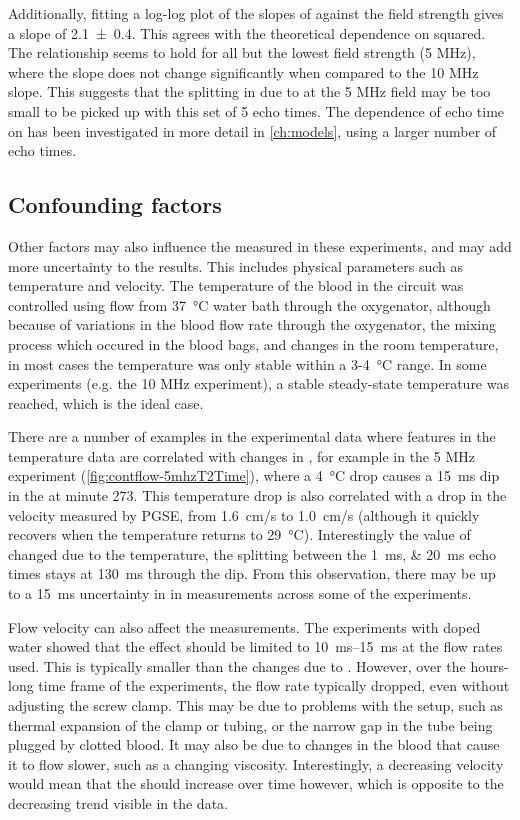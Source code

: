 Additionally, fitting a log-log plot of the slopes of \Kzero against the field strength \Bzero gives a slope of \num{2.1\pm0.4}.
This agrees with the theoretical dependence on \Bzero squared.
The relationship seems to hold for all but the lowest field strength (5 MHz), where the slope does not change significantly when compared to the 10 MHz slope.
This suggests that the splitting  in \Ttwo due to \SOtwo at the 5 MHz field may be too small to be picked up with this set of 5 echo times.
The dependence of echo time on \Ttwo has been investigated in more detail in \autoref{ch:models}, using a larger number of echo times.

\subsection{Confounding factors}

Other factors may also influence the \Ttwo measured in these experiments, and may add more uncertainty to the results.
This includes physical parameters such as temperature and velocity.
The temperature of the blood in the circuit was controlled using flow from \SI{37}{\celsius} water bath through the oxygenator, although because of variations in the blood flow rate through the oxygenator, the mixing process which occured in the blood bags, and changes in the room temperature, in most cases the temperature was only stable within a \num{3}-\SI{4}{\celsius} range.
In some experiments (e.g. the 10 MHz experiment), a stable steady-state temperature was reached, which is the ideal case.

There are a number of examples in the experimental data where features in the temperature data are correlated with changes in \Ttwo, for example in the 5 MHz experiment (\autoref{fig:contflow-5mhzT2Time}), where a \SI{4}{\celsius} drop causes a \SI{15}{ms} dip in the \Ttwo at minute 273.
This temperature drop is also correlated with a drop in the velocity measured by PGSE, from \SI{1.6}{cm/s} to \SI{1.0}{cm/s} (although it quickly recovers when the temperature returns to \SI{29}{\celsius}).
Interestingly the value of \Ttwo changed due to the temperature, the splitting between the \SIlist{1;20}{ms} echo times stays at \SI{130}{ms} through the dip.
From this observation, there may be up to a \SI{15}{ms} uncertainty in in \Ttwo measurements across some of the experiments.

Flow velocity can also affect the \Ttwo measurements.
The experiments with doped water showed that the effect should be limited to \SIrange{10}{15}{ms} at the flow rates used.
This is typically smaller than the changes due to \SOtwo.
However, over the hours-long time frame of the experiments, the flow rate typically dropped, even without adjusting the screw clamp.
This may be due to problems with the setup, such as thermal expansion of the clamp or tubing, or the narrow gap in the tube being plugged by clotted blood.
It may also be due to changes in the blood that cause it to flow slower, such as a changing viscosity.
Interestingly, a decreasing velocity would mean that the \Ttwo should increase over time however, which is opposite to the decreasing trend visible in the data.

